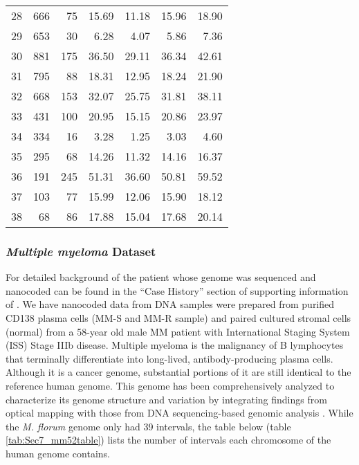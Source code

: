 \begin{center}
\begin{longtable}{lrrr|rrr}
   28 & 666 & 75 & 15.69 & 11.18 & 15.96 & 18.90 \\ 
   29 & 653 & 30 & 6.28 & 4.07 & 5.86 & 7.36 \\ 
   30 & 881 & 175 & 36.50 & 29.11 & 36.34 & 42.61 \\ 
   31 & 795 & 88 & 18.31 & 12.95 & 18.24 & 21.90 \\ 
   32 & 668 & 153 & 32.07 & 25.75 & 31.81 & 38.11 \\ 
   33 & 431 & 100 & 20.95 & 15.15 & 20.86 & 23.97 \\ 
   34 & 334 & 16 & 3.28 & 1.25 & 3.03 & 4.60 \\ 
   35 & 295 & 68 & 14.26 & 11.32 & 14.16 & 16.37 \\ 
   36 & 191 & 245 & 51.31 & 36.60 & 50.81 & 59.52 \\ 
   37 & 103 & 77 & 15.99 & 12.06 & 15.90 & 18.12 \\ 
   38 &  68 & 86 & 17.88 & 15.04 & 17.68 & 20.14 \\ 
\end{longtable}
\end{center}

\subsubsection{{\emph{Multiple myeloma}} Dataset} \label{Sec7_MM52}
For detailed background of the patient whose genome was sequenced and nanocoded can be found in the ``Case History'' section of supporting information of \cite{Gupta_etal_2015_PNAS}. We have nanocoded data from DNA samples were prepared from purified CD138 plasma cells (MM-S and MM-R sample) and paired cultured stromal cells (normal) from a 58-year old male MM patient with International Staging System (ISS) Stage IIIb disease. Multiple myeloma is the malignancy of B lymphocytes that terminally differentiate into long-lived, antibody-producing plasma cells. Although it is a cancer genome, substantial portions of it are still identical to the reference human genome. This genome has been comprehensively analyzed to characterize its genome structure and variation by integrating findings from optical mapping with those from DNA sequencing-based genomic analysis \cite{Gupta_etal_2015_PNAS}. While the {\emph{M. florum}} genome only had 39 intervals, the table below (table \ref{tab:Sec7_mm52table}) lists the number of intervals each chromosome of the human genome contains.

